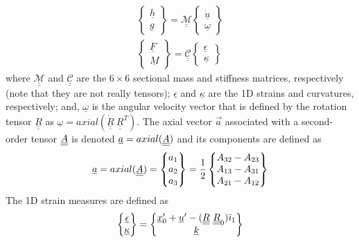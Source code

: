 \begin{align}
	\label{ConstitutiveMass}
	\begin{Bmatrix}
	\underline{h} \\
	\underline{g}
	\end{Bmatrix}
	= \underline{\underline{\mathcal{M}}} \begin{Bmatrix}
	\dot{\underline{u}} \\
	\underline{\omega}
	\end{Bmatrix} \\
	\label{ConstitutiveStiff}
	\begin{Bmatrix}
	\underline{F} \\
	\underline{M}
	\end{Bmatrix}
	= \underline{\underline{\mathcal{C}}} \begin{Bmatrix}
	\underline{\epsilon} \\
	\underline{\kappa}
	\end{Bmatrix}
\end{align}
where $\underline{\underline{\mathcal{M}}}$ and
$\underline{\underline{\mathcal{C}}}$ are the $6 \times 6$ sectional mass
and stiffness matrices, respectively (note that they are not really tensors);
$\underline{\epsilon}$ and $\underline{\kappa}$ are the 1D strains and
curvatures, respectively; and, $\underline{\omega}$ is the angular velocity
vector that is defined by the rotation tensor $\underline{\underline{R}}$ as
$\underline{\omega} =
axial(\dot{\underline{\underline{R}}}~\underline{\underline{R}}^T)$. 
The axial vector $\vec{a}$ associated with a second-order tensor $\underline{\underline{A}}$ is denoted $\underline{a}=axial(\underline{\underline{A}})$ and its components are defined as
\begin{equation}
    \label{axial}
    \underline{a} = axial(\underline{\underline{A}})=\begin{Bmatrix}
    a_1 \\
    a_2 \\
    a_3
    \end{Bmatrix}
    =\frac{1}{2}
    \begin{Bmatrix}
    A_{32}-A_{23} \\
    A_{13}-A_{31} \\
    A_{21}-A_{12}
    \end{Bmatrix}
\end{equation}
The 1D strain measures are defined as
\begin{equation}
    \label{1DStrain}
    \begin{Bmatrix}
        \underline{\epsilon} \\
        \underline{\kappa}
    \end{Bmatrix}
    =
    \begin{Bmatrix}
        \underline{x}^\prime_0 + \underline{u}^\prime - (\underline{\underline{R}} ~\underline{\underline{R}}_0) \bar{\imath}_1 \\
        \underline{k}
    \end{Bmatrix}
\end{equation}

